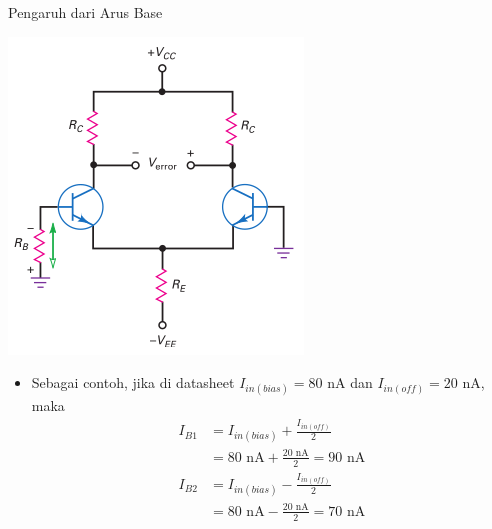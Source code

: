 \documentclass[aspectratio=169]{beamer}
\begin{document}
\begin{frame}{Pengaruh dari Arus Base}
	\begin{multicols}{2}
		\begin{center}
			\includegraphics[height=0.7\textheight]{gambar/01.diff-amp/01.base_resistor_produces_unwanted_input_voltage}
		\end{center}
	\columnbreak
		\begin{itemize}
			\item Sebagai contoh, jika di datasheet $ I_{in(bias)} = 80 \text{ nA} $ dan $ I_{in(off)} = 20 \text{ nA}$, maka
			\begin{align*}
				I_{B1} &= I_{in(bias)} + \frac{I_{in(off)}}{2} \\
				&= 80 \text{ nA} + \frac{20 \text{ nA}}{2} = 90 \text{ nA} \\
				I_{B2} &= I_{in(bias)} - \frac{I_{in(off)}}{2} \\
				&= 80 \text{ nA} - \frac{20 \text{ nA}}{2} = 70 \text{ nA}
			\end{align*}
		\end{itemize}
	\end{multicols}
\end{frame}
\end{document}
